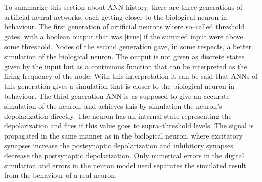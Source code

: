 	To summarize this section about ANN history, there are three generations of artificial neural networks, each getting closer to the biological neuron in behaviour.
	The first generation of artificial neurons where so--called threshold gates, with a boolean output that was [true] if the summed input were above some threshold. %
	Nodes of the second generation gave, in some respects, a better simulation of the biological neuron.
	The output is not given as discrete states given by the input but as a continuous function that can be interpreted as the firing frequency of the node. %
	With this interpretation it can be said that ANNs of this generation gives a simulation that is closer to the biological neuron in behaviour.
	The third generation ANN is as supposed to give an accurate simulation of the neuron, and achieves this by simulation the neuron's depolarization directly. 
	The neuron has an internal state representing the depolarization and fires if this value goes to supra--threshold levels.
	The signal is propagated in the same manner as in the biological neuron, where excitatory synapses increase the postsynaptic depolarization and inhibitory synapses decrease the postsynaptic depolarization.
	Only numerical errors in the digital simulation and errors in the neuron model used separates the simulated result from the behaviour of a real neuron.






